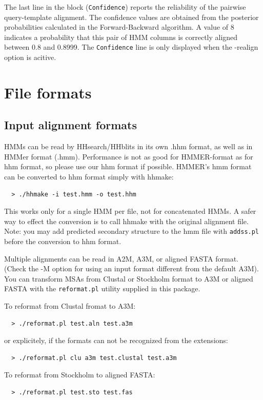 \documentclass[11pt,a4paper]{article}
\begin{document}
The last line in the block ({\tt Confidence}) reports the reliability of the pairwise 
query-template alignment. The confidence values are obtained from the posterior 
probabilities calculated in the Forward-Backward algorithm. A value of 8 indicates
a probability that this pair of HMM columns is correctly aligned between 0.8 and 0.8999. 
The {\tt Confidence} line is only displayed when the -realign option is acitive.


\section{File formats}

\subsection{Input alignment formats}

HMMs can be read by HHsearch/HHblits in its own .hhm format, as well as in HMMer format (.hmm).
Performance is not as good for HMMER-format as for hhm format, so please use 
our hhm format if possible. HMMER's hmm format can be converted to hhm format simply 
with hhmake:
\begin{verbatim}
  > ./hhmake -i test.hmm -o test.hhm
\end{verbatim}

This works only for a single HMM per file, not for concatenated HMMs. A safer way to 
effect the conversion is to call hhmake with the original alignment file. Note: you 
may add predicted secondary structure to the hmm file with \verb`addss.pl` before the 
conversion to hhm format.

Multiple alignments can be read in A2M, A3M, or aligned FASTA format. (Check the -M option for 
using an input format different from the default A3M). You can transform MSAs 
from Clustal or Stockholm format to A3M or aligned FASTA with the \verb`reformat.pl` utility 
supplied in this package. 

To reformat from Clustal fromat to A3M:
\begin{verbatim}
  > ./reformat.pl test.aln test.a3m
\end{verbatim}
or explicitely, if the formats can not be recognized from the extensions:
\begin{verbatim}
  > ./reformat.pl clu a3m test.clustal test.a3m
\end{verbatim}
To reformat from Stockholm to aligned FASTA:
\begin{verbatim}
  > ./reformat.pl test.sto test.fas
\end{verbatim}
\end{document}
